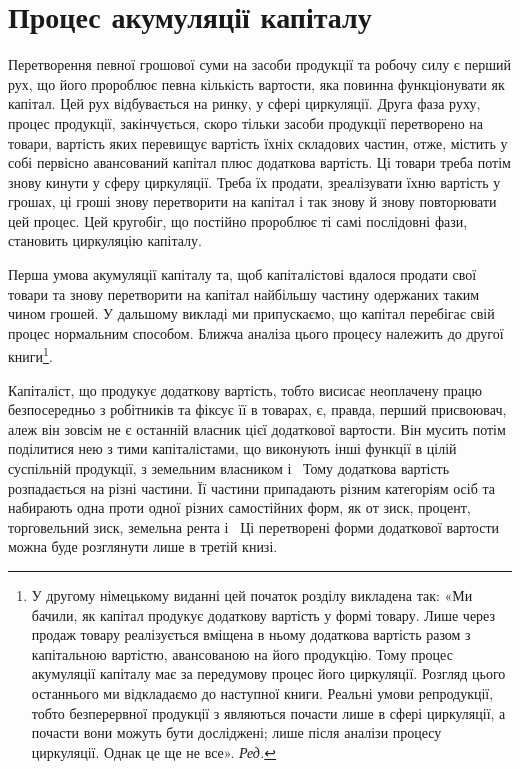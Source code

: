 
\chapter{Процес акумуляції капіталу}

Перетворення певної грошової суми на засоби продукції та
робочу силу є перший рух, що його пророблює певна кількість
вартости, яка повинна функціонувати як капітал. Цей рух відбувається
на ринку, у сфері циркуляції. Друга фаза руху, процес
продукції, закінчується, скоро тільки засоби продукції
перетворено на товари, вартість яких перевищує вартість їхніх
складових частин, отже, містить у собі первісно авансований
капітал плюс додаткова вартість. Ці товари треба потім знову
кинути у сферу циркуляції. Треба їх продати, зреалізувати їхню
вартість у грошах, ці гроші знову перетворити на капітал і
так знову й знову повторювати цей процес. Цей кругобіг, що
постійно пророблює ті самі послідовні фази, становить циркуляцію
капіталу.

Перша умова акумуляції капіталу та, щоб капіталістові вдалося
продати свої товари та знову перетворити на капітал найбільшу
частину одержаних таким чином грошей. У дальшому
викладі ми припускаємо, що капітал перебігає свій процес нормальним
способом. Ближча аналіза цього процесу належить до
другої книги\footnote*{
У другому німецькому виданні цей початок розділу викладена
так: «Ми бачили, як капітал продукує додаткову вартість у формі товару.
Лише через продаж товару реалізується вміщена в ньому додаткова
вартість разом з капітальною вартістю, авансованою на його продукцію.
Тому процес акумуляції капіталу має за передумову процес його циркуляції.
Розгляд цього останнього ми відкладаємо до наступної книги.
Реальні умови репродукції, тобто безперервної продукції з являються
почасти лише в сфері циркуляції, а почасти вони можуть бути досліджені;
лише після аналізи процесу циркуляції. Однак це ще не все». \emph{Ред.}
}.

Капіталіст, що продукує додаткову вартість, тобто висисає
неоплачену працю безпосередньо з робітників та фіксує її в товарах,
є, правда, перший присвоювач, алеж він зовсім не є
останній власник цієї додаткової вартости. Він мусить потім
поділитися нею з тими капіталістами, що виконують інші функції
в цілій суспільній продукції, з земельним власником і~
Тому додаткова вартість розпадається на різні частини. Її частини
припадають різним категоріям осіб та набирають одна проти
одної різних самостійних форм, як от зиск, процент, торговельний
зиск, земельна рента і~ Ці перетворені форми додаткової
вартости можна буде розглянути лише в третій книзі.
